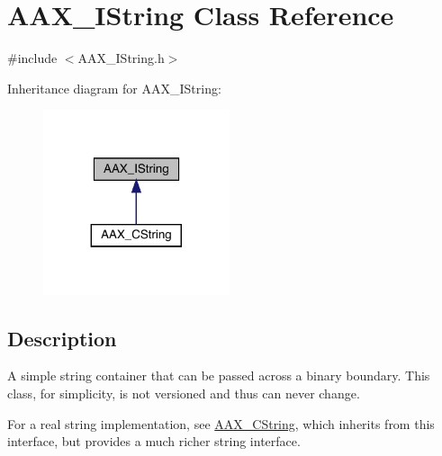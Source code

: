 \hypertarget{a01873}{}\section{A\+A\+X\+\_\+\+I\+String Class Reference}
\label{a01873}


{\ttfamily \#include $<$A\+A\+X\+\_\+\+I\+String.\+h$>$}



Inheritance diagram for A\+A\+X\+\_\+\+I\+String\+:
\nopagebreak
\begin{figure}[H]
\begin{center}
\leavevmode
\includegraphics[width=155pt]{a01872}
\end{center}
\end{figure}


\subsection{Description}
A simple string container that can be passed across a binary boundary. This class, for simplicity, is not versioned and thus can never change. 

For a real string implementation, see \mbox{\hyperlink{a01573}{A\+A\+X\+\_\+\+C\+String}}, which inherits from this interface, but provides a much richer string interface.

